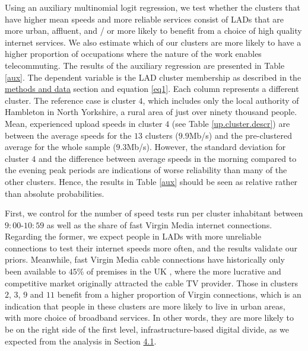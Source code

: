 \documentclass[Royal,times,sageh]{sagej}
\begin{document}
Using an auxiliary multinomial logit regression, we test whether the
clusters that have higher mean speeds and more reliable services consist
of LADs that are more urban, affluent, and / or more likely to benefit
from a choice of high quality internet services. We also estimate which
of our clusters are more likely to have a higher proportion of
occupations where the nature of the work enables telecommuting. The
results of the auxiliary regression are presented in Table \ref{aux}.
The dependent variable is the LAD cluster membership as described in the
\protect\hyperlink{sec:3}{methods and data} section and equation
\ref{eq1}. Each column represents a different cluster. The reference
case is cluster \(4\), which includes only the local authority of
Hambleton in North Yorkshire, a rural area of just over ninety thousand
people. Mean, experienced upload speeds in cluster \(4\) (see Table
\ref{up.cluster.descr}) are between the average speeds for the \(13\)
clusters (\(9.9\)Mb/s) and the pre-clustered average for the whole
sample (\(9.3\)Mb/s). However, the standard deviation for cluster \(4\)
and the difference between average speeds in the morning compared to the
evening peak periods are indications of worse reliability than many of
the other clusters. Hence, the results in Table \ref{aux} should be seen
as relative rather than absolute probabilities.

First, we control for the number of speed tests run per cluster
inhabitant between \(9:00\)-\(10:59\) as well as the share of fast
Virgin Media internet connections. Regarding the former, we expect
people in LADs with more unreliable connections to test their internet
speeds more often, and the results validate our priors. Meanwhile, fast
Virgin Media cable connections have historically only been available to
\(45\)\% of premises in the UK \citep{ofcom2016}, where the more
lucrative and competitive market originally attracted the cable TV
provider. Those in clusters \(2\), \(3\), \(9\) and \(11\) benefit from
a higher proportion of Virgin connections, which is an indication that
people in these clusters are more likely to live in urban areas, with
more choice of broadband services. In other words, they are more likely
to be on the right side of the first level, infrastructure-based digital
divide, as we expected from the analysis in Section
\protect\hyperlink{sec:4.1}{4.1}.
\end{document}
